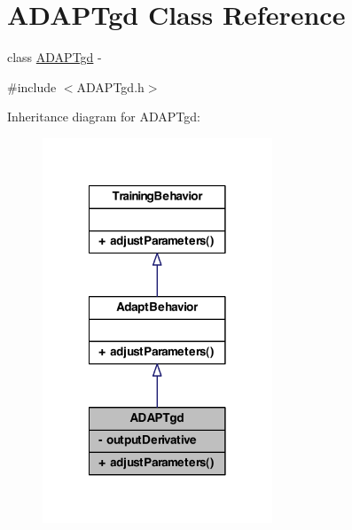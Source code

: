 \hypertarget{class_a_d_a_p_tgd}{
\section{ADAPTgd Class Reference}
\label{class_a_d_a_p_tgd}
}


class \hyperlink{class_a_d_a_p_tgd}{ADAPTgd} -\/  




{\ttfamily \#include $<$ADAPTgd.h$>$}



Inheritance diagram for ADAPTgd:\nopagebreak
\begin{figure}[H]
\begin{center}
\leavevmode
\includegraphics[width=194pt]{class_a_d_a_p_tgd__inherit__graph}
\end{center}
\end{figure}


